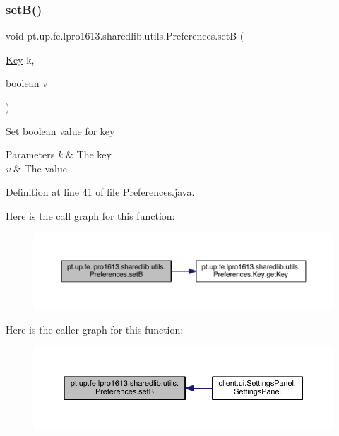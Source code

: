 \subsubsection{\texorpdfstring{set\+B()}{setB()}}
{\footnotesize\ttfamily void pt.\+up.\+fe.\+lpro1613.\+sharedlib.\+utils.\+Preferences.\+setB (\begin{DoxyParamCaption}\item[{\hyperlink{interfacept_1_1up_1_1fe_1_1lpro1613_1_1sharedlib_1_1utils_1_1_preferences_1_1_key}{Key}}]{k,  }\item[{boolean}]{v }\end{DoxyParamCaption})}

Set boolean value for key


\begin{DoxyParams}{Parameters}
{\em k} & The key \\
\hline
{\em v} & The value \\
\hline
\end{DoxyParams}


Definition at line 41 of file Preferences.\+java.

Here is the call graph for this function\+:
\nopagebreak
\begin{figure}[H]
\begin{center}
\leavevmode
\includegraphics[width=350pt]{classpt_1_1up_1_1fe_1_1lpro1613_1_1sharedlib_1_1utils_1_1_preferences_a746848d01972f8874044aef35a8621cb_cgraph}
\end{center}
\end{figure}
Here is the caller graph for this function\+:
\nopagebreak
\begin{figure}[H]
\begin{center}
\leavevmode
\includegraphics[width=350pt]{classpt_1_1up_1_1fe_1_1lpro1613_1_1sharedlib_1_1utils_1_1_preferences_a746848d01972f8874044aef35a8621cb_icgraph}
\end{center}
\end{figure}
\hypertarget{classpt_1_1up_1_1fe_1_1lpro1613_1_1sharedlib_1_1utils_1_1_preferences_ad1e7c0fc12af226ce437da9ea8bd84f3}{}\label{classpt_1_1up_1_1fe_1_1lpro1613_1_1sharedlib_1_1utils_1_1_preferences_ad1e7c0fc12af226ce437da9ea8bd84f3} 

